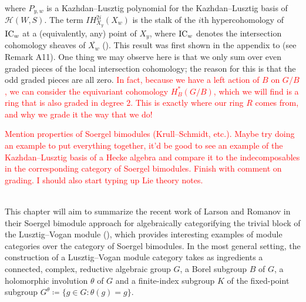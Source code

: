 \begin{remark}
\begin{align*}
\begin{split}
\end{split}
\end{align*}
\noindent where $P_{y,w}$ is a Kazhdan--Lusztig polynomial for the Kazhdan--Lusztig basis of $\mathscr{H}(W, S)$. The term $IH^{2i}_{X_y}(X_w)$ is the stalk of the $i$th hypercohomology of $\textnormal{IC}_w$ at a (equivalently, any) point of $X_y$, where $\textnormal{IC}_w$ denotes the intersection cohomology sheaves of $\overline{X_w}$ (\cite[13.13]{EMTW20}). This result was first shown in the appendix to \cite{KL79} (see Remark A11). One thing we may observe here is that we only sum over even graded pieces of the local intersection cohomology; the reason for this is that the odd graded pieces are all zero. \textcolor{red}{In fact, because we have a left action of $B$ on $G/B$, we can consider the equivariant cohomology $H_B^*(G/B)$, which we will find is a ring that is also graded in degree $2$. This is exactly where our ring $R$ comes from, and why we grade it the way that we do!}\newpage
\end{remark}

\noindent\textcolor{red}{Mention properties of Soergel bimodules (Krull--Schmidt, etc.). Maybe try doing an example to put everything together, it'd be good to see an example of the Kazhdan--Lusztig basis of a Hecke algebra and compare it to the indecomposables in the corresponding category of Soergel bimodules. Finish with comment on grading. I should also start typing up Lie theory notes.}
\newpage

\noindent 

\newpage

\noindent\\ This chapter will aim to summarize the recent work of Larson and Romanov in their Soergel bimodule approach for algebraically categorifying the trivial block of the Lusztig--Vogan module (\cite{LR22}), which provides interesting examples of module categories over the category of Soergel bimodules. In the most general setting, the construction of a Lusztig--Vogan module category takes as ingredients a connected, complex, reductive algebraic group $G$, a Borel subgroup $B$ of $G$, a holomorphic involution $\theta$ of $G$ and a finite-index subgroup $K$ of the fixed-point subgroup $G^\theta \coloneqq \{g \in G : \theta(g) = g\}$.\\

